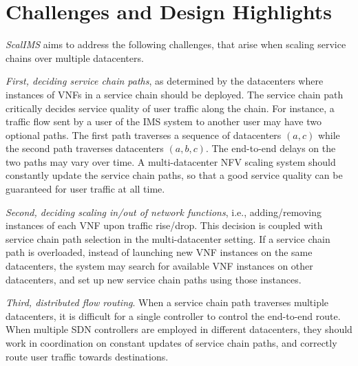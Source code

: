 \section{Challenges and Design Highlights} \label{sec:scalims-motivation}

\textit{ScalIMS} aims to address the following challenges, that arise when scaling service chains over multiple datacenters.

{\em First, deciding service chain paths}, as determined by the datacenters where instances of VNFs in a service chain should be deployed. The service chain path critically decides service quality of user traffic along the chain.
For instance, a traffic flow sent by a user of the IMS system to another user may have two optional paths. The first path traverses a sequence of datacenters $(a, c)$ while the second path traverses datacenters $(a, b, c)$. %
The end-to-end delays on the two paths may vary over time. A multi-datacenter NFV scaling system should constantly update the service chain paths, so that a good service quality can be guaranteed for user traffic at all time.


{\em Second, deciding scaling in/out of network functions}, i.e., adding/removing instances of each VNF upon traffic rise/drop. This decision is coupled with service chain path selection in the multi-datacenter setting. If a service chain path is  overloaded, instead of launching new VNF instances on the same datacenters, the system may search for available VNF instances on other datacenters, and set up new service chain paths using those instances. %

{\em Third, distributed flow routing}. %
When a service chain path traverses multiple datacenters, it is difficult for a single controller to control the end-to-end route. %
 When multiple SDN controllers are employed in different datacenters, they should work in coordination on constant updates of service chain paths, and correctly route user traffic towards destinations.

